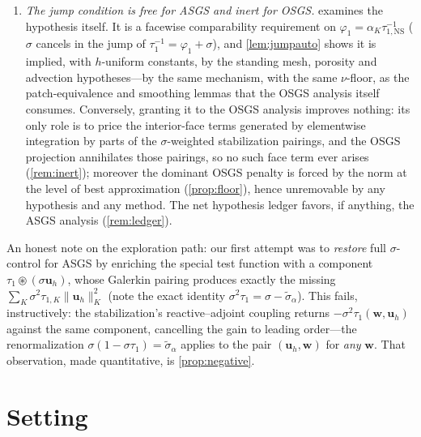 \documentclass[11pt]{article}
\theoremstyle{remark}
\newcommand{\bu}{\boldsymbol{u}}
\newcommand{\bw}{\boldsymbol{w}}
\newcommand{\norm}[1]{\lVert #1 \rVert}
\newcommand{\tns}{\tau_{1,\mathrm{NS}}}
\newcommand{\st}{\widetilde{\sigma}_\alpha}
\begin{document}
\begin{enumerate}[label=(\Roman*), leftmargin=2.5em, itemsep=0.4ex]
hypotheses, so the sharp theorem's hypothesis set is effectively the standing one;
\cref{rem:sharper} sketches an alternative, regime-splitting route to the same face
terms. Our recommendation (\cref{sec:recommendation}) remains to keep both existing
proofs and add a remark on the shared architecture, the dichotomy, and the corrected
hypothesis ledger.
\item \emph{The jump condition is free for ASGS and inert for OSGS.}
 examines the hypothesis itself. It is a facewise comparability
requirement on $\varphi_1 = \alpha_K\tns^{-1}$ ($\sigma$ cancels in the jump of
$\tau_1^{-1} = \varphi_1 + \sigma$), and \cref{lem:jumpauto} shows it is implied,
with $h$-uniform constants, by the standing mesh, porosity and advection
hypotheses---by the same mechanism, with the same $\nu$-floor, as the
patch-equivalence and smoothing lemmas that the OSGS analysis itself consumes.
Conversely, granting it to the OSGS analysis improves nothing: its only role is to
price the interior-face terms generated by elementwise integration by parts of the
$\sigma$-weighted stabilization pairings, and the OSGS projection annihilates those
pairings, so no such face term ever arises (\cref{rem:inert}); moreover the dominant
OSGS penalty is forced by the norm at the level of best approximation
(\cref{prop:floor}), hence unremovable by any hypothesis and any method. The net
hypothesis ledger favors, if anything, the ASGS analysis
(\cref{rem:ledger}).
\end{enumerate}

An honest note on the exploration path: our first attempt was to \emph{restore} full
$\sigma$-control for ASGS by enriching the special test function with a component
$\tau_1\circledast(\sigma\bu_h)$, whose Galerkin pairing produces exactly the missing
$\sum_K \sigma^2\tau_{1,K}\norm{\bu_h}_K^2$ (note the exact identity
$\sigma^2\tau_1 = \sigma - \st$). This fails, instructively: the stabilization's
reactive--adjoint coupling returns $-\sigma^2\tau_1(\bw,\bu_h)$ against the same
component, cancelling the gain to leading order---the renormalization
$\sigma(1-\sigma\tau_1)=\st$ applies to the pair $(\bu_h,\bw)$ for \emph{any} $\bw$.
That observation, made quantitative, is \cref{prop:negative}.

\section{Setting}
\label{sec:setting}
\end{document}
